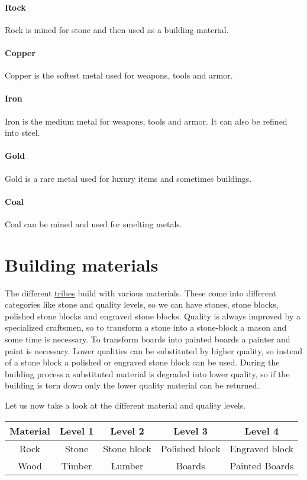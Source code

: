\paragraph{Rock}
Rock is mined for stone and then used as a building material.

\paragraph{Copper}
Copper is the softest metal used for weapons, tools and armor.

\paragraph{Iron}
Iron is the medium metal for weapons, tools and armor. It can also be refined
into steel.

\paragraph{Gold}
Gold is a rare metal used for luxury items and sometimes buildings.

\paragraph{Coal}
Coal can be mined and used for smelting metals.

\section{Building materials}\label{ch:Goods:Materials}
The different \hyperref[ch:Tribes]{tribes} build with various materials. These
come into different categories like stone and quality levels, so we can have
stones, stone blocks, polished stone blocks and engraved stone blocks. Quality
is always improved by a specialized craftsmen, so to transform a stone into a
stone-block a mason and some time is necessary. To transform boards into
painted boards a painter and paint is necessary. Lower qualities can be
substituted by higher quality, so instead of a stone block a polished or
engraved stone block can be used. During the building process a substituted
material is degraded into lower quality, so if the building is torn down only
the lower quality material can be returned.

Let us now take a look at the different material and quality levels.
\begin{longtable}{ccccc}
	\toprule
	Material & Level 1      & Level 2     & Level 3        & Level 4        \\
	\midrule
	Rock     & Stone        & Stone block & Polished block & Engraved block \\
	Wood     & \Gls{Timber} & Lumber      & Boards         & Painted Boards \\
\end{longtable}

